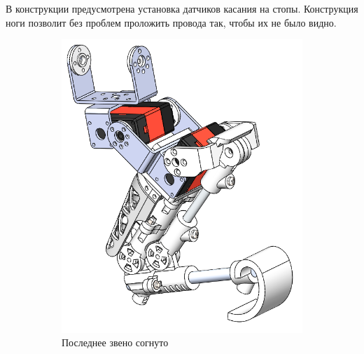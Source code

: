 \newpage
В конструкции предусмотрена установка датчиков касания на стопы. Конструкция ноги позволит без проблем проложить провода так, чтобы их не было видно.
\begin{figure}[ht]
    \centering
    \begin{subfigure}[b]{0.45\textwidth}    
        \centering
        \includegraphics[scale=0.55]{chapter_mechanics_construction/figure15.png}
        \caption{Последнее звено согнуто}
    \end{subfigure}
    \begin{subfigure}[b]{0.45\textwidth}
        \centering

\end{subfigure}
\end{figure}
